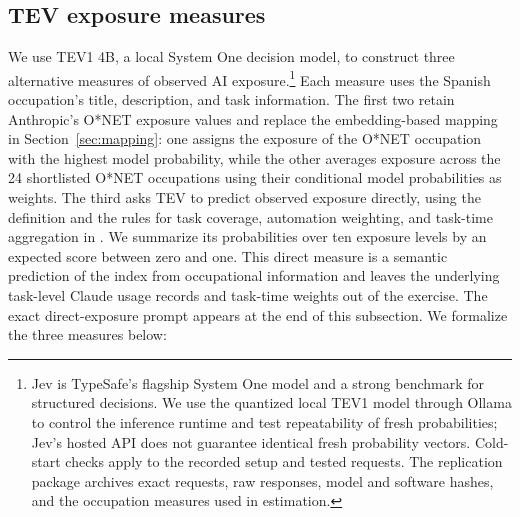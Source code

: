 \clearpage
\subsection*{TEV exposure measures}
\label{sec:appendix_od_jev}
We use TEV1 4B, a local System One decision model, to construct three alternative measures of observed AI exposure.\footnote{Jev is TypeSafe's flagship System One model and a strong benchmark for structured decisions. We use the quantized local TEV1 model through Ollama to control the inference runtime and test repeatability of fresh probabilities; Jev's hosted API does not guarantee identical fresh probability vectors. Cold-start checks apply to the recorded setup and tested requests. The replication package archives exact requests, raw responses, model and software hashes, and the occupation measures used in estimation.} Each measure uses the Spanish occupation's title, description, and task information. The first two retain Anthropic's O*NET exposure values and replace the embedding-based mapping in Section~\ref{sec:mapping}: one assigns the exposure of the O*NET occupation with the highest model probability, while the other averages exposure across the 24 shortlisted O*NET occupations using their conditional model probabilities as weights. The third asks TEV to predict observed exposure directly, using the definition and the rules for task coverage, automation weighting, and task-time aggregation in \citet{massenkoff_mccrory_2026}. We summarize its probabilities over ten exposure levels by an expected score between zero and one. This direct measure is a semantic prediction of the index from occupational information and leaves the underlying task-level Claude usage records and task-time weights out of the exercise. The exact direct-exposure prompt appears at the end of this subsection. We formalize the three measures below:

